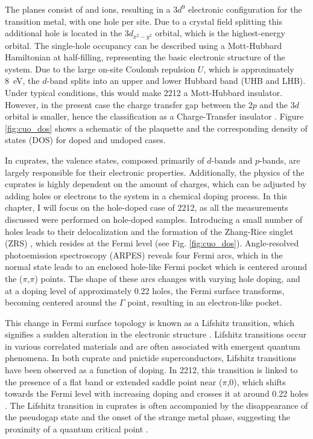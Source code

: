 The  planes consist of  and  ions, resulting in a $3d^9$ electronic configuration for the transition metal, with one hole per  site.
Due to a crystal field splitting this additional hole is located in the $3d_{x^2-y^2}$ orbital, which is the highest-energy orbital.
The single-hole occupancy can be described using a Mott-Hubbard Hamiltonian at half-filling, representing the basic electronic structure of the system.
Due to the large on-site Coulomb repulsion $U$, which is approximately \qty{8}{\electronvolt}, the $d$-band splits into an upper and lower Hubbard band (UHB and LHB).
Under typical conditions, this would make 2212 a Mott-Hubbard insulator.
However, in the present case the charge transfer gap between the  $2p$ and the  $3d$ orbital is smaller, hence the classification as a Charge-Transfer insulator \cite{zaanen_band_1985,zegrodnik_superconductivity_2019}.
Figure \ref{fig:cuo_dos} shows a schematic of the  plaquette and the corresponding density of states (DOS) for doped and undoped cases.

In cuprates, the valence states, composed primarily of  $d$-bands and  $p$-bands, are largely responsible for their electronic properties.
Additionally, the physics of the cuprates is highly dependent on the amount of charges, which can be adjusted by adding holes or electrons to the system in a chemical doping process.
In this chapter, I will focus on the hole-doped case of 2212, as all the measurements discussed were performed on hole-doped samples.
Introducing a small number of holes leads to their delocalization and the formation of the Zhang-Rice singlet (ZRS) \cite{zhang_effective_1988}, which resides at the Fermi level (see Fig. \ref{fig:cuo_dos}).
Angle-resolved photoemission spectroscopy (ARPES) reveals four Fermi arcs, which in the normal state leads to an enclosed hole-like Fermi pocket which is centered around the ($\pi$,$\pi$) points.
The shape of these arcs changes with varying hole doping, and at a doping level of approximately 0.22 holes, the Fermi surface transforms, becoming centered around the $\Gamma$ point, resulting in an electron-like pocket.

This change in Fermi surface topology is known as a Lifshitz transition, which signifies a sudden alteration in the electronic structure \cite{lifshitz_anomalies_1960}.
Lifshitz transitions occur in various correlated materials and are often associated with emergent quantum phenomena.
In both cuprate and pnictide superconductors, Lifshitz transitions have been observed as a function of doping.
In 2212, this transition is linked to the presence of a flat band or extended saddle point near ($\pi$,$0$), which shifts towards the Fermi level with increasing doping and crosses it at around 0.22 holes \cite{campuzano_photoemission_2004, gofron_observation_1994}.
The Lifshitz transition in cuprates is often accompanied by the disappearance of the pseudogap state \cite{matt_electron_2015, benhabib_collapse_2015} and the onset of the strange metal phase, suggesting the proximity of a quantum critical point \cite{michon_thermodynamic_2019, chen_incoherent_2019, cooper_anomalous_2009, badoux_change_2016, putzke_reduced_2021}.

